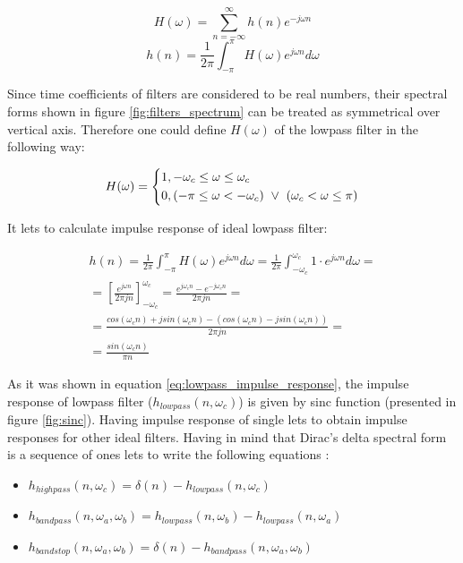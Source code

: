 \documentclass[magister]{dyplom}
\begin{document}
	\begin{equation}
		H(\omega) = \sum_{n = -\infty}^{\infty} h(n) e^{-j\omega n}		
	\end{equation}
	\begin{equation}
		h(n) = \frac{1}{2 \pi} \int_{-\pi}^{\pi} H(\omega) e^{j\omega n} d \omega
	\end{equation}
	
	Since time coefficients of filters are considered to be real numbers, their spectral forms shown in figure \ref{fig:filters_spectrum} can be treated as symmetrical over vertical axis. Therefore one could define $H(\omega)$ of the lowpass filter in the following way:
	
	\begin{equation}
		H(\omega) = \begin{dcases}
						1, -\omega_c \leq \omega \leq \omega_c \\
						0, (-\pi \leq \omega < -\omega_c) \  \vee \ (\omega_c < \omega \leq \pi)
					\end{dcases}
	\end{equation}
	
	It lets to calculate impulse response of ideal lowpass filter:
	
	\begin{align} \label{eq:lowpass_impulse_response}
		h(n) = \frac{1}{2\pi} \int_{-\pi}^{\pi} H(\omega) e^{j \omega n} d \omega =  \frac{1}{2\pi} \int_{-\omega_c}^{\omega_c} 1 \cdot e^{j \omega n} d \omega = \nonumber \\ = \left[ \frac{e^{j\omega n}}{2\pi j n} \right]^{\omega_c}_{-\omega_c} = \frac{e^{j\omega_c n} - e^{-j\omega_c n}}{2\pi j n} = \nonumber \\ = \frac{cos(\omega_c n) + j sin(\omega_c n) - (cos(\omega_c n) - j sin(\omega_c n))}{2\pi j n} = \nonumber \\ = \frac{sin(\omega_c n)}{\pi n}
	\end{align}
	
	As it was shown in equation \ref{eq:lowpass_impulse_response}, the impulse response of lowpass filter ($h_{lowpass}(n, \omega_c)$) is given by sinc function (presented in figure \ref{fig:sinc}). Having impulse response of single lets to obtain impulse responses for other ideal filters. Having in mind that Dirac's delta spectral form is a sequence of ones lets to write the following equations \cite{IntroductionDSPArticle}:
	
	\begin{itemize}
		\item $h_{highpass}(n, \omega_c) = \delta(n) - h_{lowpass}(n, \omega_c)$
		\item $h_{bandpass}(n, \omega_a, \omega_b) = h_{lowpass}(n, \omega_b) - h_{lowpass}(n, \omega_a)$
		\item $h_{bandstop}(n, \omega_a, \omega_b) = \delta(n) - h_{bandpass}(n, \omega_a, \omega_b)$
	\end{itemize}
	
\end{document}
